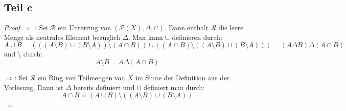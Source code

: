 \documentclass[10pt,a4paper]{article}
\begin{document}
\subsection{Teil c}
\begin{proof}
  $\Leftarrow$: Sei $\mathscr{R}$ ein Unterring von $(\mathscr{P}(X), \Delta, \cap)$.
  Dann enthält $\mathscr{R}$ die leere Menge als neutrales Element bezüglich $\Delta$.
  Man kann $\cup$ definieren durch:
  \begin{equation}
    A \cup B = (((A \setminus B) \cup (B \setminus A)) \setminus (A \cap B)) \cup ((A \cap B) \setminus ((A \setminus B) \cup (B \setminus A))) = (A \Delta B) \Delta (A \cap B)
  \end{equation}
  und $\setminus$ durch:
  \begin{equation}
    A \setminus B = A \Delta (A \cap B)
  \end{equation}

  $\Rightarrow$: Sei $\mathscr{R}$ ein Ring von Teilmengen von $X$ im Sinne der Definition aus der Vorlesung.
  Dann ist $\Delta$ bereits definiert und $\cap$ definiert man durch:
  \begin{equation}
    A \cap B = (A \cup B) \setminus ((A \setminus B) \cup (B \setminus A))
  \end{equation}
\end{proof}
\end{document}
